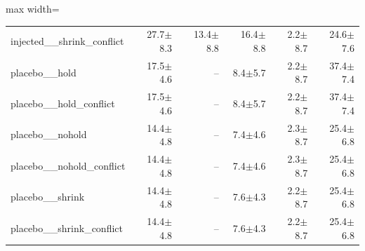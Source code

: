 \begin{table}[t]
{\begin{adjustbox}{max width=\linewidth}
\begin{tabular}{lrrrrr}
injected\_\_shrink\_conflict & 27.7$\pm$8.3 & 13.4$\pm$8.8 & 16.4$\pm$8.8 & 2.2$\pm$8.7 & 24.6$\pm$7.6 \\
placebo\_\_hold & 17.5$\pm$4.6 & -- & 8.4$\pm$5.7 & 2.2$\pm$8.7 & 37.4$\pm$7.4 \\
placebo\_\_hold\_conflict & 17.5$\pm$4.6 & -- & 8.4$\pm$5.7 & 2.2$\pm$8.7 & 37.4$\pm$7.4 \\
placebo\_\_nohold & 14.4$\pm$4.8 & -- & 7.4$\pm$4.6 & 2.3$\pm$8.7 & 25.4$\pm$6.8 \\
placebo\_\_nohold\_conflict & 14.4$\pm$4.8 & -- & 7.4$\pm$4.6 & 2.3$\pm$8.7 & 25.4$\pm$6.8 \\
placebo\_\_shrink & 14.4$\pm$4.8 & -- & 7.6$\pm$4.3 & 2.2$\pm$8.7 & 25.4$\pm$6.8 \\
placebo\_\_shrink\_conflict & 14.4$\pm$4.8 & -- & 7.6$\pm$4.3 & 2.2$\pm$8.7 & 25.4$\pm$6.8 \\
\bottomrule
\end{tabular}
\end{adjustbox}
}
\end{table}